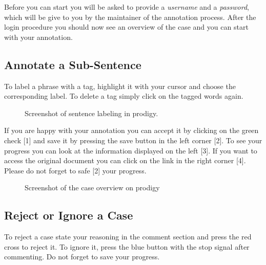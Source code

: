 \documentclass{article}
\begin{document}
Before you can start you will be asked to provide a \emph{username} and a \emph{password}, which will be give to you by the maintainer of the annotation process. After the login procedure you should now see an overview of the case and you can start with your annotation.

\subsection{Annotate a Sub-Sentence}
To label a phrase with a tag, highlight it with your cursor and choose the corresponding label. To delete a tag simply click on the tagged words again. 

\begin{figure}[h]
     \caption{Screenshot of sentence labeling in prodigy.}
\end{figure}
\pagebreak

If you are happy with your annotation you can accept it by clicking on the green check [1] and save it by pressing the save button in the left corner [2].
To see your progress you can look at the information displayed on the left [3]. If you want to access the original document you can click on the link in the right corner [4]. Please do not forget to safe [2] your progress.

\begin{figure}[h]
     \caption{Screenshot of the case overview on prodigy}
\end{figure}
\pagebreak

\subsection{Reject or Ignore a Case}
\label{reject-ignore-case}
To reject a case state your reasoning in the comment section and press the red cross to reject it. To ignore it, press the blue button with the stop signal after commenting. Do not forget to save your progress.
\end{document}
